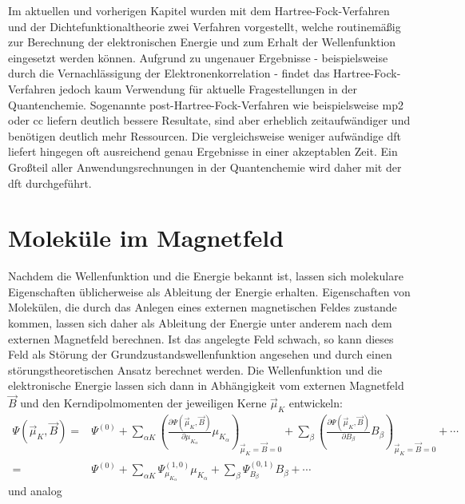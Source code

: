 \bigskip
Im aktuellen und vorherigen Kapitel wurden mit dem Hartree-Fock-Verfahren und der Dichtefunktionaltheorie zwei Verfahren vorgestellt, welche routinemäßig zur Berechnung der elektronischen Energie und zum Erhalt der Wellenfunktion eingesetzt werden können. Aufgrund zu ungenauer Ergebnisse - beispielsweise durch die Vernachlässigung der Elektronenkorrelation - findet das Hartree-Fock-Verfahren jedoch kaum Verwendung für aktuelle Fragestellungen in der Quantenchemie. Sogenannte post-Hartree-Fock-Verfahren wie beispielsweise \ac{mp2} oder \ac{cc} liefern deutlich bessere Resultate, sind aber erheblich zeitaufwändiger und benötigen deutlich mehr Ressourcen. Die vergleichsweise weniger aufwändige \ac{dft} liefert hingegen oft ausreichend genau Ergebnisse in einer akzeptablen Zeit. Ein Großteil aller Anwendungsrechnungen in der Quantenchemie wird daher mit der \ac{dft} durchgeführt. 

\section{Moleküle im Magnetfeld}

Nachdem die Wellenfunktion und die Energie bekannt ist, lassen sich molekulare Eigenschaften üblicherweise als Ableitung der Energie erhalten. Eigenschaften von Molekülen, die durch das Anlegen eines externen magnetischen Feldes zustande kommen, lassen sich daher als Ableitung der Energie unter anderem nach dem externen Magnetfeld berechnen. Ist das angelegte Feld schwach, so kann dieses Feld als Störung der Grundzustandswellenfunktion angesehen und durch einen störungstheoretischen Ansatz berechnet werden. Die Wellenfunktion und die elektronische Energie lassen sich dann in Abhängigkeit vom externen Magnetfeld $\vec{B}$ und den Kerndipolmomenten der jeweiligen Kerne $\vec{\mu}_K$ entwickeln:\supercite{ditchfield1974self} 
\begin{equation}
\begin{aligned}
\Psi(\vec{\mu}_K,\vec{B})=&\Psi^{(0)}+\sum_{\alpha K}\left(\frac{\partial\Psi(\vec{\mu}_K,\vec{B})}{\partial \mu_{K_\alpha}}\mu_{K_\alpha}\right)_{\vec{\mu}_K=\vec{B}=0}+\sum_\beta\left(\frac{\partial\Psi(\vec{\mu}_K,\vec{B})}{\partial B_\beta}B_\beta\right)_{\vec{\mu}_K=\vec{B}=0}+\cdots\\
=&\Psi^{(0)}+\sum_{\alpha K}\Psi_{\mu_{K_\alpha}}^{(1,0)}\mu_{K_\alpha}+\sum_\beta\Psi_{B_\beta}^{(0,1)}B_\beta+\cdots
\end{aligned}
\end{equation}
und analog

